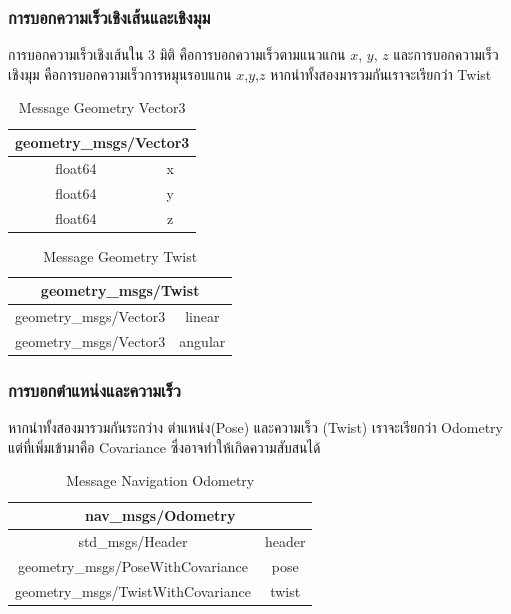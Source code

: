 \subsubsection*{การบอกความเร็วเชิงเส้นและเชิงมุม}
การบอกความเร็วเชิงเส้นใน 3 มิติ คือการบอกความเร็วตามแนวแกน $x$, $y$, $z$ และการบอกความเร็วเชิงมุม
คือการบอกความเร็วการหมุนรอบแกน $x$,$y$,$z$ หากนำทั้งสองมารวมกันเราจะเรียกว่า Twist
\begin{table}[h!]
	\centering
	\begin{tabular}{| c | c |}
		\hline
		\multicolumn{2}{|c|}{geometry\_msgs/Vector3}\\
		\hline
		float64 & x \\
		float64 & y \\
		float64 & z \\
		\hline
	\end{tabular}
	\caption{Message Geometry Vector3}
	\label{tab:geometry_vector3}
\end{table}
\begin{table}[h!]
	\centering
	\begin{tabular}{| c | c |}
		\hline
		\multicolumn{2}{|c|}{geometry\_msgs/Twist}\\
		\hline
		geometry\_msgs/Vector3 & linear \\
		geometry\_msgs/Vector3 & angular \\
		\hline
	\end{tabular}
	\caption{Message Geometry Twist}
	\label{tab:geometry_twist}
\end{table}

\subsubsection*{การบอกตำแหน่งและความเร็ว}
หากนำทั้งสองมารวมกันระกว่าง ตำแหน่ง(Pose) และความเร็ว (Twist) เราจะเรียกว่า Odometry
แต่ที่เพิ่มเข้ามาคือ Covariance ซึ่งอาจทำให้เกิดความสับสนได้
\begin{table}[h!]
	\centering
	\begin{tabular}{| c | c |}
		\hline
		\multicolumn{2}{|c|}{nav\_msgs/Odometry}\\
		\hline
		std\_msgs/Header & header \\
		geometry\_msgs/PoseWithCovariance & pose \\
		geometry\_msgs/TwistWithCovariance & twist \\
		\hline
	\end{tabular}
	\caption{Message Navigation Odometry}
	\label{tab:nav_odometry}
\end{table}

